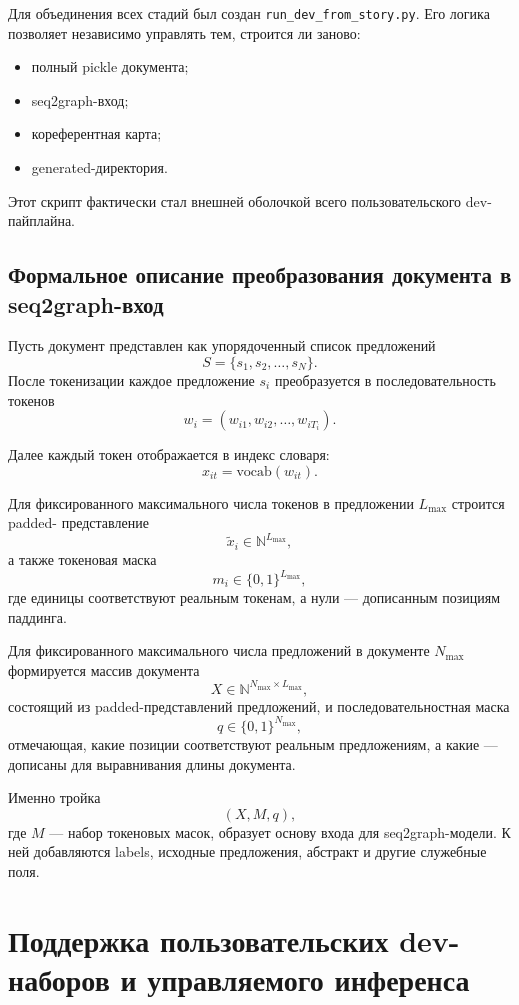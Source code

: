 \documentclass[12pt,a4paper]{article}
\begin{document}
Для объединения всех стадий был создан \texttt{run\_dev\_from\_story.py}. Его логика
позволяет независимо управлять тем, строится ли заново:

\begin{itemize}
    \item полный pickle документа;
    \item seq2graph-вход;
    \item кореферентная карта;
    \item generated-директория.
\end{itemize}

Этот скрипт фактически стал внешней оболочкой всего пользовательского dev-пайплайна.

\subsection{Формальное описание преобразования документа в seq2graph-вход}

Пусть документ представлен как упорядоченный список предложений
\[
S = \{s_1, s_2, \dots, s_N\}.
\]
После токенизации каждое предложение $s_i$ преобразуется в последовательность токенов
\[
w_i = (w_{i1}, w_{i2}, \dots, w_{iT_i}).
\]

Далее каждый токен отображается в индекс словаря:
\[
x_{it} = \mathrm{vocab}(w_{it}).
\]

Для фиксированного максимального числа токенов в предложении $L_{\max}$ строится padded-
представление
\[
\tilde{x}_i \in \mathbb{N}^{L_{\max}},
\]
а также токеновая маска
\[
m_i \in \{0,1\}^{L_{\max}},
\]
где единицы соответствуют реальным токенам, а нули --- дописанным позициям паддинга.

Для фиксированного максимального числа предложений в документе $N_{\max}$ формируется
массив документа
\[
X \in \mathbb{N}^{N_{\max} \times L_{\max}},
\]
состоящий из padded-представлений предложений, и последовательностная маска
\[
q \in \{0,1\}^{N_{\max}},
\]
отмечающая, какие позиции соответствуют реальным предложениям, а какие --- дописаны для
выравнивания длины документа.

Именно тройка
\[
(X, M, q),
\]
где $M$ --- набор токеновых масок, образует основу входа для seq2graph-модели. К ней
добавляются labels, исходные предложения, абстракт и другие служебные поля.

\section{Поддержка пользовательских dev-наборов и управляемого инференса}
\end{document}
